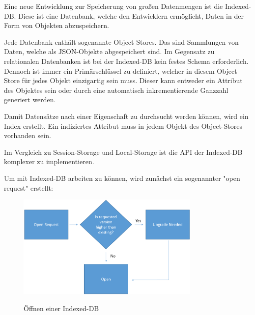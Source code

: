 \label{sec:indexeddb}

Eine neue Entwicklung zur Speicherung von großen Datenmengen ist die Indexed-DB. 
Diese ist eine Datenbank, welche den Entwicklern ermöglicht, Daten in der Form von Objekten abzuspeichern.

Jede Datenbank enthält sogenannte Object-Stores. Das sind Sammlungen von Daten, welche als JSON-Objekte abgespeichert sind. 
Im Gegensatz zu relationalen Datenbanken ist bei der Indexed-DB kein festes Schema erforderlich. 
Dennoch ist immer ein Primärschlüssel zu definiert, welcher in diesem Object-Store für jedes Objekt einzigartig sein muss.
Dieser kann entweder ein Attribut des Objektes sein oder durch eine automatisch inkrementierende Ganzzahl generiert werden. 

Damit Datensätze nach einer Eigenschaft zu durchsucht werden können, wird ein Index erstellt. 
Ein indiziertes Attribut muss in jedem Objekt des Object-Stores vorhanden sein.

Im Vergleich zu Session-Storage und Local-Storage ist die API der Indexed-DB komplexer zu implementieren.

Um mit Indexed-DB arbeiten zu können, wird zunächst ein sogenannter "open request" erstellt:


\begin{figure}[H]
    \centering
    \includegraphics[width=0.8\textwidth]{media/Webspeicher/openDb.png}
    \caption{Öffnen einer Indexed-DB}
    \cite{fig:openDB}
\end{figure}

